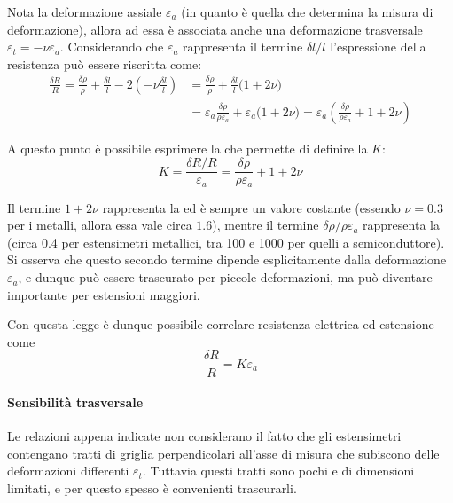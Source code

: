 		Nota la deformazione assiale $\varepsilon_a$ (in quanto è quella che determina la misura di deformazione), allora ad essa è associata anche una deformazione trasversale $\varepsilon_t = - \nu \varepsilon_a$. Considerando che $\varepsilon_a$ rappresenta il termine $\delta l/l$ l'espressione della resistenza può essere riscritta come:
		\begin{align*}
			\frac{\delta R}{R} =  \frac{\delta \rho}{\rho} + \frac{\delta l}{l} - 2\left( -\nu \frac{\delta l}{l} \right) & = \frac{\delta \rho}{\rho} + \frac{\delta l}{l} \big(1+2\nu\big) \\ 
			& = \varepsilon_a \frac{\delta \rho}{\rho \varepsilon_a} + \varepsilon_a \big(1+2\nu\big) = \varepsilon_a \left( \frac{\delta \rho}{\rho \varepsilon_a} +  1+2\nu\right)
		\end{align*}
		
		\begin{concetto}
			A questo punto è possibile esprimere la  che permette di definire la  $K$:
			\begin{equation} \label{eq:def:primalegge}
				K = \frac{\delta R / R}{\varepsilon_a} = \frac{\delta \rho}{\rho \varepsilon_a} + 1 + 2\nu
			\end{equation} 
		\end{concetto} 
	
		Il termine $1+2\nu$ rappresenta la  ed è sempre un valore costante (essendo $\nu = 0.3$ per i metalli, allora essa vale circa $1.6$), mentre il termine $\delta \rho / \rho \varepsilon_a$ rappresenta la  (circa 0.4 per estensimetri metallici, tra 100 e 1000 per quelli a semiconduttore). Si osserva che questo secondo termine dipende esplicitamente dalla deformazione $\varepsilon_a$, e dunque può essere trascurato per piccole deformazioni, ma può diventare importante per estensioni maggiori.
		
		Con questa legge è dunque possibile correlare resistenza elettrica ed estensione come
		\[ \frac {\delta R} R = K \varepsilon_a  \]
		
		\paragraph{Sensibilità trasversale} Le relazioni appena indicate non considerano il fatto che gli estensimetri contengano tratti di griglia perpendicolari all'asse di misura che subiscono delle deformazioni differenti $\varepsilon_t$. Tuttavia questi tratti sono pochi e di dimensioni limitati, e per questo spesso è convenienti trascurarli. 
		

